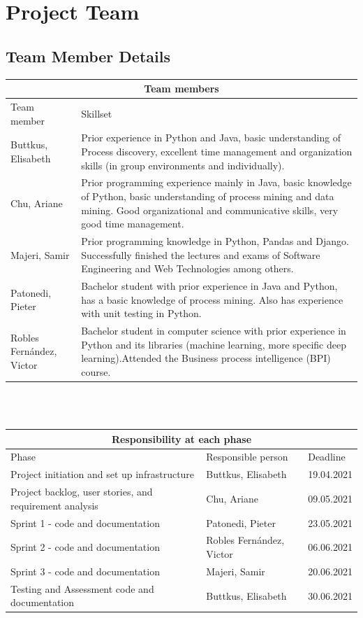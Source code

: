 \documentclass[a4paper,11pt]{scrartcl}
\begin{document}
\section*{Project Team}
\subsection*{Team Member Details}

\vspace{4mm}

\begin{tabular}{ |p{3.2cm}|p{13cm}| }
 \hline
 \multicolumn{2}{|c|}{Team members} \\
 \hline
 Team member & Skillset  \\
 \hline
 Buttkus, Elisabeth   & Prior experience in Python and Java, basic understanding of Process discovery, excellent time management and organization skills (in group environments and individually).     \\
 \hline
 Chu, Ariane & Prior programming experience mainly in Java, basic knowledge of Python, basic understanding of process mining and data mining. Good organizational and communicative skills, very good time management. \\
 \hline
 Majeri, Samir & Prior programming knowledge in Python, Pandas and Django. Successfully finished the lectures and exams of Software Engineering and Web Technologies among others. \\
 \hline
 Patonedi, Pieter  &Bachelor student with prior experience in Java and Python, has a basic knowledge of process mining. Also has experience with unit testing in Python. \\
 \hline
 Robles Fernández, Victor & Bachelor student in computer science with prior experience in Python and its libraries (machine learning, more specific deep learning).Attended the  Business process intelligence (BPI) course.\\
 \hline
\end{tabular}
\\
\vspace{4mm}
\\
\begin{tabular}{ |p{9cm}|p{4.5cm}|p{2cm}|  }
 \hline
 \multicolumn{3}{|c|}{Responsibility at each phase} \\
 \hline
 Phase & Responsible person & Deadline \\
 \hline
 Project initiation and set up infrastructure & Buttkus, Elisabeth    & 19.04.2021\\
 \hline
 Project backlog, user stories, and requirement analysis &   Chu, Ariane  & 09.05.2021\\
 \hline
 Sprint 1 - code and documentation & Patonedi, Pieter
 & 23.05.2021\\
 \hline
 Sprint 2 - code and documentation & Robles Fernández, Victor 
 & 06.06.2021\\
 \hline
 Sprint 3 - code and documentation&  Majeri, Samir
  & 20.06.2021\\
  \hline
 Testing and Assessment code and documentation & Buttkus, Elisabeth  & 30.06.2021\\
 \hline
\end{tabular}
\end{document}
